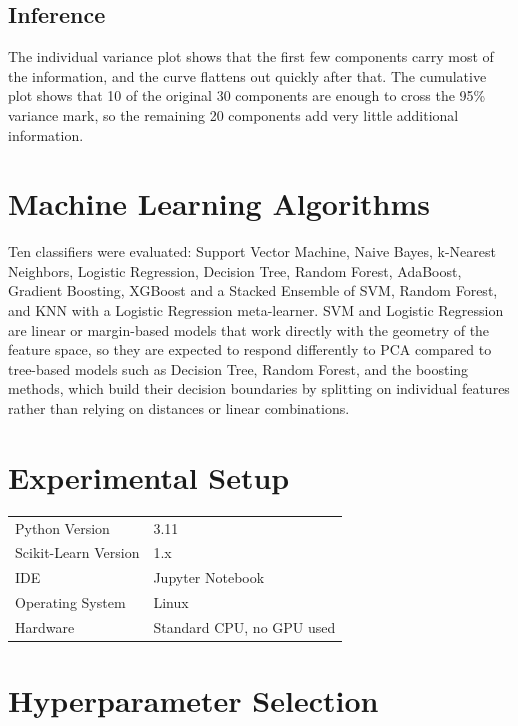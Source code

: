 \documentclass[12pt,a4paper]{article}
\begin{document}
\subsection*{Inference}
The individual variance plot shows that the first few components carry most of the information, and the curve flattens out quickly after that. The cumulative plot shows that 10 of the original 30 components are enough to cross the 95\% variance mark, so the remaining 20 components add very little additional information.

\section{Machine Learning Algorithms}
Ten classifiers were evaluated: Support Vector Machine, Naive Bayes, k-Nearest Neighbors, Logistic Regression, Decision Tree, Random Forest, AdaBoost, Gradient Boosting, XGBoost and a Stacked Ensemble of SVM, Random Forest, and KNN with a Logistic Regression meta-learner. SVM and Logistic Regression are linear or margin-based models that work directly with the geometry of the feature space, so they are expected to respond differently to PCA compared to tree-based models such as Decision Tree, Random Forest, and the boosting methods, which build their decision boundaries by splitting on individual features rather than relying on distances or linear combinations.

\section{Experimental Setup}
\begin{tabular}{ll}
\toprule
Python Version & 3.11 \\
Scikit-Learn Version & 1.x \\
IDE & Jupyter Notebook \\
Operating System & Linux \\
Hardware & Standard CPU, no GPU used \\
\bottomrule
\end{tabular}

\section{Hyperparameter Selection}
\end{document}
